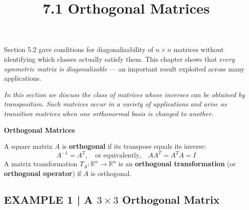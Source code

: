 \documentclass{article}
\title{7.1 Orthogonal Matrices}
\date{}
\author{}
\newcommand{\redheading}[1]{{\vspace{2mm}\noindent\Large\bfseries\color{red!55!black} #1\par}\vspace{2mm}}
\theoremstyle{mystyle}
\begin{document}
\maketitle

\begin{tcolorbox}[colback=blue!5, colframe=blue!60!black,
  title=Chapter 7: Diagonalization and Quadratic Forms --- Overview,
  boxrule=0.5mm, arc=3mm]
Section 5.2 gave conditions for diagonalizability of $n\times n$ matrices without
identifying which classes actually satisfy them. This chapter shows that \emph{every
symmetric matrix is diagonalizable} --- an important result exploited across many
applications.
\end{tcolorbox}

{\itshape\color{blue!45!black}
In this section we discuss the class of matrices whose inverses can be obtained by
transposition. Such matrices occur in a variety of applications and arise as transition
matrices when one orthonormal basis is changed to another.\par}

\vspace{2mm}

\redheading{Orthogonal Matrices}

\begin{tcolorbox}[colback=teal!4, colframe=teal!65!black,
  title={\textbf{Definition 1}}, boxrule=0.5mm, arc=3mm]
A square matrix $A$ is \textbf{orthogonal} if its transpose equals its inverse:
\[
  A^{-1} = A^T, \quad\text{or equivalently,}\quad AA^T = A^TA = I \tag{1}
\]
A matrix transformation $T_A\colon\mathbb{R}^n\to\mathbb{R}^n$ is an
\textbf{orthogonal transformation} (or \textbf{orthogonal operator}) if $A$ is orthogonal.
\end{tcolorbox}

\subsection*{EXAMPLE 1 | A $3\times3$ Orthogonal Matrix}
\end{document}
